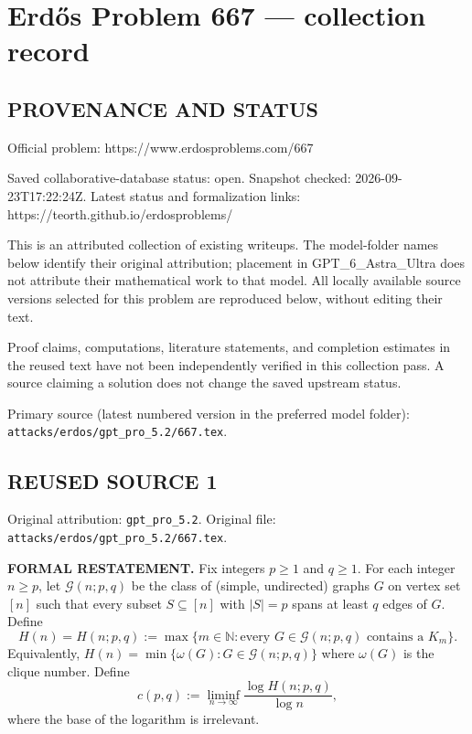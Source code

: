 \section*{Erd\H{o}s Problem 667 --- collection record}

\subsection*{PROVENANCE AND STATUS}
Official problem: https://www.erdosproblems.com/667

Saved collaborative-database status: open.
Snapshot checked: 2026-09-23T17:22:24Z.
Latest status and formalization links: https://teorth.github.io/erdosproblems/

This is an attributed collection of existing writeups. The model-folder names below identify their original attribution; placement in GPT\_6\_Astra\_Ultra does not attribute their mathematical work to that model. All locally available source versions selected for this problem are reproduced below, without editing their text.

Proof claims, computations, literature statements, and completion estimates in the reused text have not been independently verified in this collection pass. A source claiming a solution does not change the saved upstream status.

Primary source (latest numbered version in the preferred model folder): \texttt{attacks/erdos/gpt\_pro\_5.2/667.tex}.

\subsection*{REUSED SOURCE 1}
Original attribution: \texttt{gpt\_pro\_5.2}.
Original file: \texttt{attacks/erdos/gpt\_pro\_5.2/667.tex}.



\noindent\textbf{FORMAL RESTATEMENT.}
Fix integers $p\ge 1$ and $q\ge 1$.
For each integer $n\ge p$, let $\mathcal{G}(n;p,q)$ be the class of (simple, undirected) graphs $G$ on vertex set $[n]$ such that every subset $S\subseteq [n]$ with $|S|=p$ spans at least $q$ edges of $G$.
Define
\[
H(n)=H(n;p,q) := \max\big\{ m\in\mathbb{N} : \text{every } G\in\mathcal{G}(n;p,q) \text{ contains a } K_m\big\}.
\]
Equivalently, $H(n)=\min\{\omega(G): G\in\mathcal{G}(n;p,q)\}$ where $\omega(G)$ is the clique number.
Define
\[
c(p,q) := \liminf_{n\to\infty} \frac{\log H(n;p,q)}{\log n},
\]
where the base of the logarithm is irrelevant.

